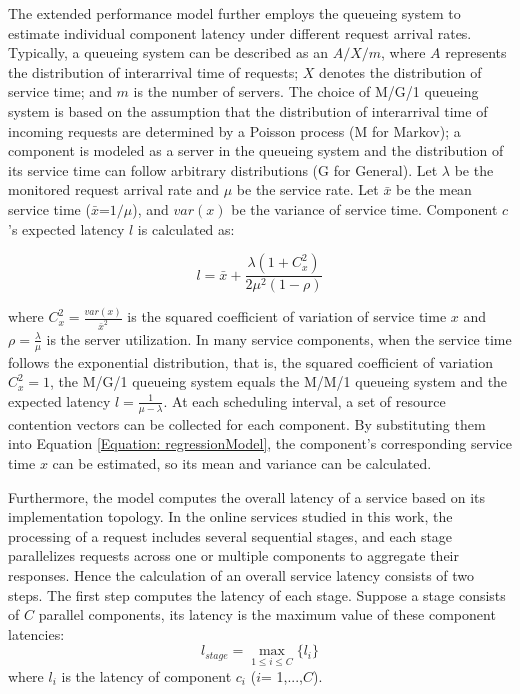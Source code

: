 \documentclass[10pt, conference, compsocconf]{IEEEtran}
\begin{document}
The extended performance model further employs the queueing system to estimate individual component latency under different request arrival rates.
Typically, a queueing system can be described as an $A/X/m$, where $A$ represents the distribution of interarrival time of requests; $X$ denotes the distribution of service time; and $m$ is the number of servers.
The choice of M/G/1 queueing system is based on the assumption that the distribution of interarrival time of incoming requests are determined by a Poisson process (M for Markov); a component is modeled as a server in the queueing system and the distribution of its service time can follow arbitrary distributions (G for General). Let $\lambda$ be the monitored request arrival rate and $\mu$ be the service rate. Let $\bar{x}$ be the mean service time ($\bar{x}$=$1/\mu$), and $var(x)$ be the variance of service time. Component $c$'s expected latency $l$ is calculated as:

\begin{equation}
l=\bar{x} + \frac{\lambda(1+C^{2}_{x})}{2\mu^2(1-\rho)}
\label{Equation: a server's response time}
\end{equation}

where $C^{2}_{x}=\frac{var(x)}{\bar{x}^2}$ is the squared coefficient of variation of service time $x$ and $\rho=\frac{\lambda}{\mu}$ is the server utilization. In many service components, when the service time follows the exponential distribution, that is, the squared coefficient of variation $C^{2}_{x}=1$, the M/G/1 queueing system equals the M/M/1 queueing system and the expected latency $l=\frac{1}{\mu-\lambda}$.
At each scheduling interval, a set of resource contention vectors can be collected for each component. By substituting them into Equation \ref{Equation: regressionModel}, the component's corresponding service time $x$ can be estimated, so its mean and variance can be calculated.



Furthermore, the model computes the overall latency of a service based on its implementation topology. In the online services studied in this work, the processing of a request includes several sequential stages, and each stage parallelizes requests across one or multiple components to aggregate their responses. Hence the calculation of an overall service latency consists of two steps. The first step computes the latency of each stage. Suppose a stage consists of $C$ parallel components, its latency is the maximum value of these component latencies:
\begin{equation}
l_{stage}= \max_{1 \leq i \leq C}\{l_{i}\}
\label{Equation: a stage's response time}
\end{equation}
where $l_{i}$ is the latency of component $c_{i}$ ($i$= 1,...,$C$).
\end{document}
